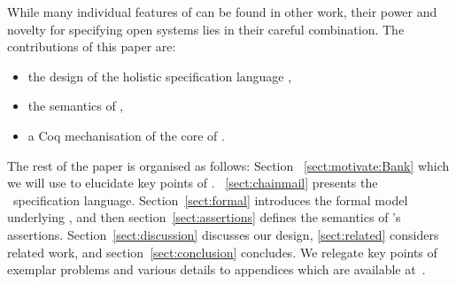 
While many individual features of \Chainmail can be found in other work, 
their power and novelty for specifying open systems lies in their careful combination.
The contributions of this paper are:
\begin{itemize}
\item the design of the holistic specification language \Chainmail,
\item the semantics of \Chainmail, 
\item a Coq mechanisation of the core of \Chainmail.
\end{itemize}  
  
  
The rest of the paper is organised as follows:
Section
~\ref{sect:motivate:Bank} 
 which we will use 
to elucidate key points of \Chainmail.
~\ref{sect:chainmail} presents the \Chainmail\ specification
language.  Section~\ref{sect:formal} introduces the formal model
underlying \Chainmail, and then section~\ref{sect:assertions} defines
the 
semantics of \Chainmail's assertions.
Section~\ref{sect:discussion}
discusses our design, \ref{sect:related} considers related
work, and section~\ref{sect:conclusion} concludes.
We relegate key points of exemplar problems and various details to appendices which are available at~\cite{examples}.
